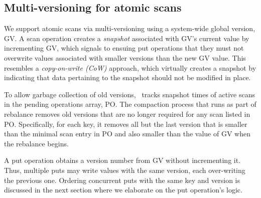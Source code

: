 \subsection{Multi-versioning for atomic scans}
\label{ssec:scans}


We support atomic scans via multi-versioning using a system-wide global version, GV. 
A scan operation creates a \emph{snapshot} associated with GV's current value by incrementing GV, 
which signals to ensuing put operations that they must not overwrite values associated with 
smaller versions than the new GV value.
This resembles a \emph{copy-on-write (CoW)} approach, which virtually creates a snapshot by 
indicating that data pertaining to the snapshot should not be modified in place.  

To allow garbage collection of old versions, \sys\  tracks snapshot times of 
active scans in the pending operations array, PO.
The compaction process that runs as part of rebalance removes old versions that are no longer required for any  
scan listed in PO. Specifically, for each key, it removes all but the last version that is smaller than the minimal
scan entry in PO and also smaller than the value of GV when the rebalance begins. 



A put operation obtains a version number from GV without incrementing it. Thus, multiple puts may write values with the same version, each over-writing the previous one. Ordering concurrent puts with the same key and version is discussed in the next section where we elaborate on the put operation's logic.

